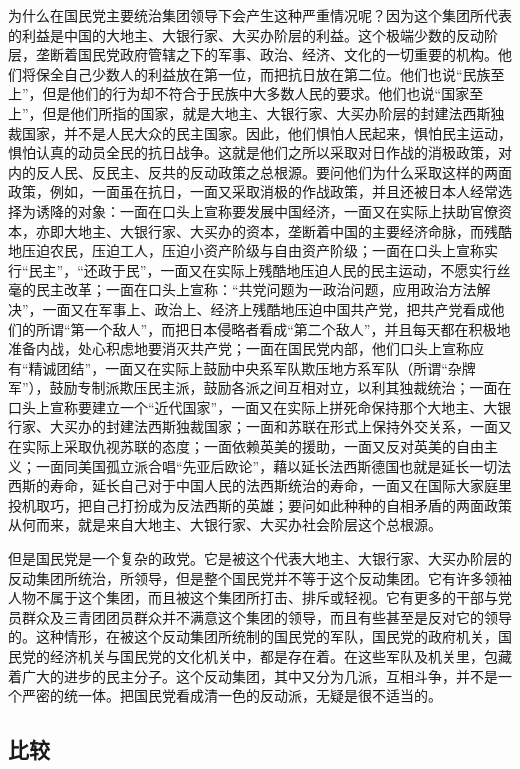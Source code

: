 为什么在国民党主要统治集团领导下会产生这种严重情况呢？因为这个集团所代表的利益是中国的大地主、大银行家、大买办阶层的利益。这个极端少数的反动阶层，垄断着国民党政府管辖之下的军事、政治、经济、文化的一切重要的机构。他们将保全自己少数人的利益放在第一位，而把抗日放在第二位。他们也说“民族至上”，但是他们的行为却不符合于民族中大多数人民的要求。他们也说“国家至上”，但是他们所指的国家，就是大地主、大银行家、大买办阶层的封建法西斯独裁国家，并不是人民大众的民主国家。因此，他们惧怕人民起来，惧怕民主运动，惧怕认真的动员全民的抗日战争。这就是他们之所以采取对日作战的消极政策，对内的反人民、反民主、反共的反动政策之总根源。要问他们为什么采取这样的两面政策，例如，一面虽在抗日，一面又采取消极的作战政策，并且还被日本人经常选择为诱降的对象：一面在口头上宣称要发展中国经济，一面又在实际上扶助官僚资本，亦即大地主、大银行家、大买办的资本，垄断着中国的主要经济命脉，而残酷地压迫农民，压迫工人，压迫小资产阶级与自由资产阶级；一面在口头上宣称实行“民主”，“还政于民”，一面又在实际上残酷地压迫人民的民主运动，不愿实行丝毫的民主改革；一面在口头上宣称：“共党问题为一政治问题，应用政治方法解决”，一面又在军事上、政治上、经济上残酷地压迫中国共产党，把共产党看成他们的所谓“第一个敌人”，而把日本侵略者看成“第二个敌人”，并且每天都在积极地准备内战，处心积虑地要消灭共产党；一面在国民党内部，他们口头上宣称应有“精诚团结”，一面又在实际上鼓励中央系军队欺压地方系军队（所谓“杂牌军”），鼓励专制派欺压民主派，鼓励各派之间互相对立，以利其独裁统治；一面在口头上宣称要建立一个“近代国家”，一面又在实际上拼死命保持那个大地主、大银行家、大买办的封建法西斯独裁国家；一面和苏联在形式上保持外交关系，一面又在实际上采取仇视苏联的态度；一面依赖英美的援助，一面又反对英美的自由主义；一面同美国孤立派合唱“先亚后欧论”，藉以延长法西斯德国也就是延长一切法西斯的寿命，延长自己对于中国人民的法西斯统治的寿命，一面又在国际大家庭里投机取巧，把自己打扮成为反法西斯的英雄；要问如此种种的自相矛盾的两面政策从何而来，就是来自大地主、大银行家、大买办社会阶层这个总根源。

但是国民党是一个复杂的政党。它是被这个代表大地主、大银行家、大买办阶层的反动集团所统治，所领导，但是整个国民党并不等于这个反动集团。它有许多领袖人物不属于这个集团，而且被这个集团所打击、排斥或轻视。它有更多的干部与党员群众及三青团团员群众并不满意这个集团的领导，而且有些甚至是反对它的领导的。这种情形，在被这个反动集团所统制的国民党的军队，国民党的政府机关，国民党的经济机关与国民党的文化机关中，都是存在着。在这些军队及机关里，包藏着广大的进步的民主分子。这个反动集团，其中又分为几派，互相斗争，并不是一个严密的统一体。把国民党看成清一色的反动派，无疑是很不适当的。

\subsection{比较}

